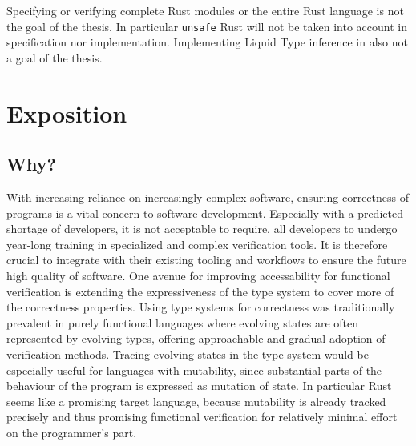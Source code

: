\documentclass[11pt]{article}
\newcommand{\code}[1]{\texttt{#1}}
\begin{document}
Specifying or verifying complete Rust modules or the entire Rust language is not the goal of the thesis. In particular \code{unsafe} Rust will not be taken into account in specification nor implementation. Implementing Liquid Type inference in also not a goal of the thesis.


\section{Exposition}

\subsection{Why?}

With increasing reliance on increasingly complex software, ensuring correctness of programs is a vital concern to software development. Especially with a predicted shortage of developers\cite{breaux_2021_2021-1}, it is not acceptable to require, all developers to undergo year-long training in specialized and complex verification tools. It is therefore crucial to integrate with their existing tooling and workflows to ensure the future high quality of software.
One avenue for improving accessability for functional verification is extending the expressiveness of the type system to cover more of the correctness properties.
Using type systems for correctness was traditionally prevalent in purely functional languages where evolving states are often represented by evolving types, offering approachable and gradual adoption of verification methods. Tracing evolving states in the type system would be especially useful for languages with mutability, since substantial parts of the behaviour of the program is expressed as mutation of state. In particular Rust seems like a promising target language, because mutability is already tracked precisely and thus promising functional verification for relatively minimal effort on the programmer's part.



\end{document}
